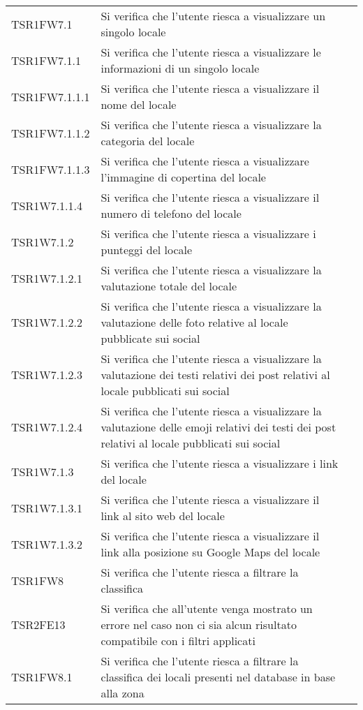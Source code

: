 \begin{longtable}{ m{}<{\centering}  m{}<{\centering}  m{}<{\centering} }
	TSR1FW7.1 & Si verifica che l'utente riesca a visualizzare un singolo locale & \Su \\
	TSR1FW7.1.1 & Si verifica che l'utente riesca a visualizzare le informazioni di un singolo locale & \Su \\
	TSR1FW7.1.1.1 & Si verifica che l'utente riesca a visualizzare il nome del locale & \Su \\
	TSR1FW7.1.1.2 & Si verifica che l'utente riesca a visualizzare la categoria del locale & \Su \\
	TSR1FW7.1.1.3 & Si verifica che l'utente riesca a visualizzare l'immagine di copertina del locale & \Su \\
	TSR1W7.1.1.4 & Si verifica che l'utente riesca a visualizzare il numero di telefono del locale & \Su \\
	TSR1W7.1.2 & Si verifica che l'utente riesca a visualizzare i punteggi del locale & \Su \\
	TSR1W7.1.2.1 & Si verifica che l'utente riesca a visualizzare la valutazione totale del locale & \Su \\
	TSR1W7.1.2.2	& Si verifica che l'utente riesca a visualizzare la valutazione delle foto relative al locale pubblicate sui social & \Su \\
	TSR1W7.1.2.3	& Si verifica che l'utente riesca a visualizzare la valutazione dei testi relativi dei post relativi al locale pubblicati sui social & \Su \\
	TSR1W7.1.2.4	& Si verifica che l'utente riesca a visualizzare la valutazione delle emoji relativi dei testi dei post relativi al locale pubblicati sui social & \Su \\
	TSR1W7.1.3	& Si verifica che l'utente riesca a visualizzare i link del locale & \Su \\
	TSR1W7.1.3.1 & Si verifica che l'utente riesca a visualizzare il link al sito web del locale & \Su \\
	TSR1W7.1.3.2 & Si verifica che l'utente riesca a visualizzare il link alla posizione su Google Maps del locale & \Su \\
	TSR1FW8 & Si verifica che l'utente riesca a filtrare la classifica & \Su \\
	TSR2FE13 & Si verifica che all'utente venga mostrato un errore nel caso non ci sia alcun risultato compatibile con i filtri applicati & \Su \\
	TSR1FW8.1 & Si verifica che l'utente riesca a filtrare la classifica dei locali presenti nel database in base alla zona & \Su \\

\end{longtable}
